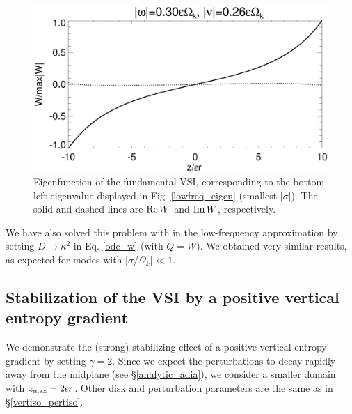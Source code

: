 \begin{figure}
  \includegraphics[width=\linewidth]{figures/eigenvector_iso}
  \caption{Eigenfunction of the fundamental VSI,
    corresponding to the bottom-left eigenvalue displayed in
    Fig. \ref{lowfreq_eigen} (smallest $|\sigma|$). The
    solid and dashed lines are $\operatorname{Re} W$ and $\operatorname{Im} W$, respectively. 
    \label{lowfreq_eigenfunc}
  }
\end{figure}

We have also solved this problem with in the low-frequency 
approximation by setting $D\to\kappa^2$ in Eq. \ref{ode_w} (with $Q=W$). We
obtained very similar results, as expected for modes with
$|\sigma/\Omega_k|\ll1$. 

\subsection{Stabilization of the VSI by a positive vertical entropy
  gradient}
We demonstrate the (strong) stabilizing effect of a  
positive vertical entropy gradient by setting $\gamma=2$.  
Since we expect the perturbations to decay rapidly
away from the midplane (see \S\ref{analytic_adia}), we consider a
smaller domain with $z_\mathrm{max} = 2\epsilon r$. 
Other disk and perturbation parameters are the same as in
\S\ref{vertiso_pertiso}.    


